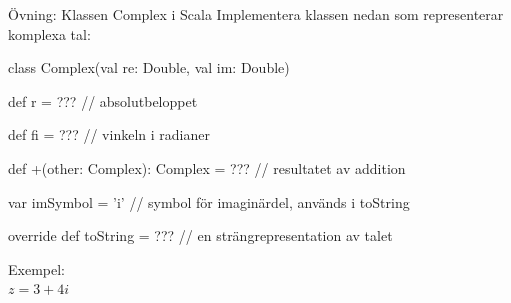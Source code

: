 

\begin{Slide}{Övning: Klassen Complex i Scala}\SlideFontSmall
Implementera klassen  nedan som representerar komplexa tal:
\begin{Code}
  class Complex(val re: Double, val im: Double){
    def r  = ???  // absolutbeloppet

    def fi = ???  // vinkeln i radianer

    def +(other: Complex): Complex = ???  // resultatet av addition

    var imSymbol = 'i'  // symbol för imaginärdel, används i toString

    override def toString = ???  // en strängrepresentation av talet
  }
\end{Code}

\begin{minipage}{0.3\textwidth}
  Exempel: \\$z = 3 + 4i$
\end{minipage}
\begin{minipage}{0.5\textwidth}
\end{minipage}

\end{Slide}


